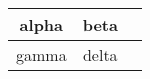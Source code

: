 \begin{table}
\centering
\begin{tabular}{ccc}
alpha 	 & beta 	 &  \\ \hline
gamma 	 & delta 	 &  \\ \hline
 \hline
\end{tabular}
\end{table}